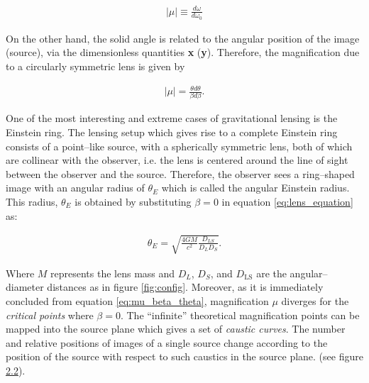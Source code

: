 \documentclass[paper=a4, fontsize=11pt]{scrartcl} %
\numberwithin{equation}{section} %
\numberwithin{figure}{section} %
\numberwithin{table}{section} %
\begin{document}
\begin{eqnarray}
\label{eq:mu_domegas}
|\mu| \equiv \frac{d\omega}{d\omega_0}
\end{eqnarray}

On the other hand, the solid angle is related to the angular position of the image (source), via the dimensionless quantities \textbf{x} (\textbf{y}). Therefore, the magnification due to a circularly symmetric lens is given by 

\begin{eqnarray}
\label{eq:mu_beta_theta}
|\mu| = \frac{\theta d\theta}{\beta d\beta}.
\end{eqnarray}

One of the most interesting and extreme cases of gravitational lensing is the Einstein ring. The lensing setup which gives rise to a complete Einstein ring consists of a point--like source, with a spherically symmetric lens, both of which are collinear with the observer, i.e. the lens is centered around the line of sight between the observer and the source. Therefore, the observer sees a ring--shaped image with an angular radius of $\theta_E$ which is called the angular Einstein radius. This radius, $\theta_E$ is obtained by substituting $\beta=0$ in equation \ref{eq:lens_equation} as:

 \begin{eqnarray}
 \theta_E = \sqrt{\frac{4GM}{c^2}\frac{D_{LS}}{D_LD_S}}.
 \label{eq:lens}
 \end{eqnarray}

 Where $M$ represents the lens mass and $D_L$, $D_S$, and $D_\mathrm{LS}$ are the angular--diameter distances as in figure \ref{fig:config}. Moreover, as it is immediately concluded from equation \ref{eq:mu_beta_theta}, magnification $\mu$ diverges for the \emph{critical points} where $\beta=0$. The ``infinite'' theoretical magnification %
points can be mapped into the source plane which gives a set of \emph{caustic curves}. The number and relative positions of images of a single source change according to the position of the source with respect to such caustics in the source plane. (see figure \hyperref[fig:cusps]{2.2}).
\end{document}
